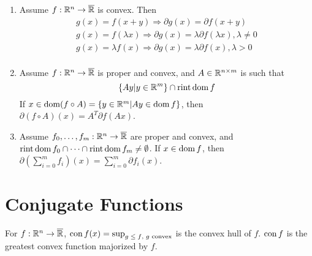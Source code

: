 \begin{thm}
  \label{sec:subgradients-11}
  \begin{enumerate}
  \item Assume $f: \mathbb{R}^{n} \rightarrow \overline {\mathbb{R}}$  is convex. Then
    \begin{align}
      \label{eq:17}
      g(x) = f(x+y) \Rightarrow \partial g(x) = \partial f(x+y) \\
      g(x) = f(\lambda x) \Rightarrow \partial g(x) = \lambda \partial
      f(\lambda x), \lambda \neq 0 \\
      \label{eq:19}
      g(x) = \lambda f(x) \Rightarrow \partial g(x) = \lambda \partial
      f(x), \lambda > 0 \\
    \end{align}
  \item Assume $f: \mathbb{R}^{n} \rightarrow \overline {\mathbb{R}}$ is proper and
    convex, and $A \in \mathbb{R}^{n \times m}$ is such that
    \begin{equation}
      \label{eq:21}
      \{ Ay | y \in \mathbb{R}^{m} \}  \cap \operatorname*{rint} \operatorname*{dom} f
    \end{equation}
    If $x \in \operatorname*{dom} (f \circ A) = \{ y \in \mathbb{R}^{m} | Ay \in \operatorname*{dom} f \} $,
    then $\partial (f \circ A)(x) = A^{T} \partial f(Ax)$.
  \item Assume $f_{0}, \dots, f_{m}: \mathbb{R}^{n} \rightarrow \overline {\mathbb{R}}$
    are proper and convex, and $\operatorname*{rint} \operatorname*{dom} f_{0} \cap \dots \cap \operatorname*{rint}
    \operatorname*{dom} f_{m} \neq \emptyset$.  If $x \in \operatorname*{dom} f$, then
    $\partial(\sum_{i=0}^{m} f_{i})(x) = \sum_{i=0}^{m} \partial f_{i}(x)$.
  \end{enumerate}
\end{thm}

\section{Conjugate Functions}
\label{sec:conjugate-functions}

\begin{defn}
  \label{sec:conjugate-functions-1}
  For $f: \mathbb{R}^{n} \rightarrow \overline {\mathbb{R}}$, $\operatorname*{con} f(x) =\sup_{\text{$g
      \leq f$, $g$ convex}}$ is the convex hull of $f$.
  $\operatorname*{con} f$ is the greatest convex function majorized by $f$.
\end{defn}




